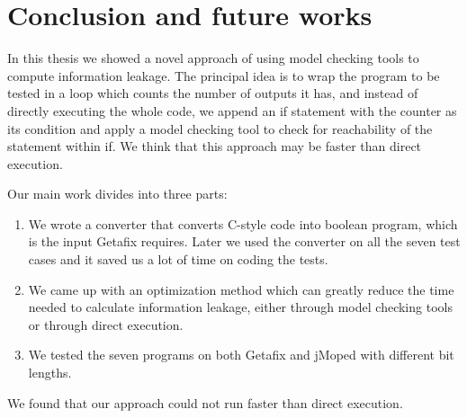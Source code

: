 \chapter{Conclusion and future works}
	\label{CH_summary}

In this thesis we showed a novel approach of using model checking tools to compute information leakage. The principal idea is to wrap the program to be tested in a loop which counts the number of outputs it has, and instead of directly executing the whole code, we append an if statement with the counter as its condition and apply a model checking tool to check for reachability of the statement within if. We think that this approach may be faster than direct execution.

Our main work divides into three parts:
\begin{enumerate}
\item We wrote a converter that converts C-style code into boolean program, which is the input Getafix requires. Later we used the converter on all the seven test cases and it saved us a lot of time on coding the tests. 
\item We came up with an optimization method which can greatly reduce the time needed to calculate information leakage, either through model checking tools or through direct execution.
\item We tested the seven programs on both Getafix and jMoped with different bit lengths.
\end{enumerate}

We found that our approach could not run faster than direct execution. 